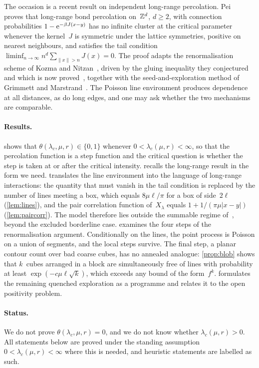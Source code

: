 \documentclass[11pt,letterpaper]{article}
\begin{document}
The occasion is a recent result on independent long-range percolation. Pei~\cite{Pei26} proves that long-range bond percolation on~$\mathbb Z^d$, $d\ge2$, with connection probabilities $1-\mathrm{e}^{-\beta J(x-y)}$ has no infinite cluster at the critical parameter whenever the kernel~$J$ is symmetric under the lattice symmetries, positive on nearest neighbours, and satisfies the tail condition $\liminf_{n\to\infty}n^d\sum_{\lVert x\rVert>n}J(x)=0$. The proof adapts the renormalisation scheme of Kozma and Nitzan~\cite{KN24}, driven by the gluing inequality they conjectured and which is now proved~\cite{OAI26a,BR26,Gou26}, together with the seed-and-exploration method of Grimmett and Marstrand~\cite{GM90}. The Poisson line environment produces dependence at all distances, as do long edges, and one may ask whether the two mechanisms are comparable.

\paragraph{Results.}  shows that $\theta(\lambda_c,\mu,r)\in\{0,1\}$ whenever $0<\lambda_c(\mu,r)<\infty$, so that the percolation function is a step function and the critical question is whether the step is taken at or after the critical intensity.  recalls the long-range result in the form we need.  translates the line environment into the language of long-range interactions: the quantity that must vanish in the tail condition is replaced by the number of lines meeting a box, which equals $8\mu\ell/\pi$ for a box of side~$2\ell$ (\cref{lem:lines}), and the pair correlation function of~$X_\lambda$ equals $1+1/(\pi\mu\lvert x-y\rvert)$ (\cref{lem:paircorr}). The model therefore lies outside the summable regime of~\cite{Pei26}, beyond the excluded borderline case.  examines the four steps of the renormalisation argument. Conditionally on the lines, the point process is Poisson on a union of segments, and the local steps survive. The final step, a planar contour count over bad coarse cubes, has no annealed analogue: \cref{prop:blob} shows that $k$~cubes arranged in a block are simultaneously free of lines with probability at least $\exp(-c\mu\ell\sqrt k)$, which exceeds any bound of the form~$f^k$.  formulates the remaining quenched exploration as a programme and relates it to the open positivity problem.

\paragraph{Status.} We do not prove $\theta(\lambda_c,\mu,r)=0$, and we do not know whether $\lambda_c(\mu,r)>0$. All statements below are proved under the standing assumption $0<\lambda_c(\mu,r)<\infty$ where this is needed, and heuristic statements are labelled as such.
\end{document}
